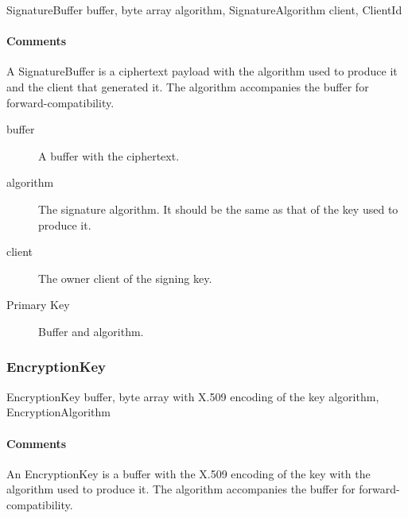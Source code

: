 \documentclass[a4paper,10pt]{article}
\begin{document}
\begin{verbbox}
SignatureBuffer
{
  buffer, byte array
  algorithm, SignatureAlgorithm
  client, ClientId
}
\end{verbbox}
\begin{center}
\theverbbox
\end{center}

\begin{inparaitem}[ ]
 \item \infrastructure
\end{inparaitem}

\paragraph*{Comments}
A SignatureBuffer is a ciphertext payload with the algorithm used to produce it and the client that generated it. The algorithm accompanies the buffer for forward-compatibility.

\SpecialItem
\begin{description}
 \item[buffer] A buffer with the ciphertext.
 \item[algorithm] The signature algorithm. It should be the same as that of the key used to produce it.
 \item[client] The owner client of the signing key.
\end{description}

\begin{description}
 \item[Primary Key] Buffer and algorithm.
\end{description}

\subsubsection{EncryptionKey}

\begin{verbbox}
EncryptionKey
{
  buffer, byte array with X.509 encoding of the key
  algorithm, EncryptionAlgorithm
}
\end{verbbox}
\begin{center}
\theverbbox
\end{center}

\begin{inparaitem}[ ]
 \item \infrastructure
\end{inparaitem}

\paragraph*{Comments}
An EncryptionKey is a buffer with the X.509 encoding of the key with the algorithm used to produce it. The algorithm accompanies the buffer for forward-compatibility.
\end{document}
